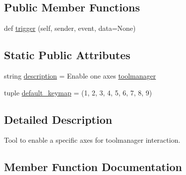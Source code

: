 \subsection*{Public Member Functions}
\begin{DoxyCompactItemize}
\item 
def \hyperlink{classmatplotlib_1_1backend__tools_1_1__ToolEnableNavigation_ab969158fb4495be64c3d905fc92c9b9f}{trigger} (self, sender, event, data=None)
\end{DoxyCompactItemize}
\subsection*{Static Public Attributes}
\begin{DoxyCompactItemize}
\item 
string \hyperlink{classmatplotlib_1_1backend__tools_1_1__ToolEnableNavigation_a21333b9a8c30a4bb3b90844818ccb5c5}{description} = \textquotesingle{}Enable one axes \hyperlink{classmatplotlib_1_1backend__tools_1_1ToolBase_aa7888dab7ba0552f93037f1df4b192f6}{toolmanager}\textquotesingle{}
\item 
tuple \hyperlink{classmatplotlib_1_1backend__tools_1_1__ToolEnableNavigation_a33e0b12a5433f3c51a08b06d4c4cca94}{default\+\_\+keymap} = (\textquotesingle{}1\textquotesingle{}, \textquotesingle{}2\textquotesingle{}, \textquotesingle{}3\textquotesingle{}, \textquotesingle{}4\textquotesingle{}, \textquotesingle{}5\textquotesingle{}, \textquotesingle{}6\textquotesingle{}, \textquotesingle{}7\textquotesingle{}, \textquotesingle{}8\textquotesingle{}, \textquotesingle{}9\textquotesingle{})
\end{DoxyCompactItemize}


\subsection{Detailed Description}
\begin{DoxyVerb}Tool to enable a specific axes for toolmanager interaction.\end{DoxyVerb}
 

\subsection{Member Function Documentation}
\mbox{\label{classmatplotlib_1_1backend__tools_1_1__ToolEnableNavigation_ab969158fb4495be64c3d905fc92c9b9f}} 
